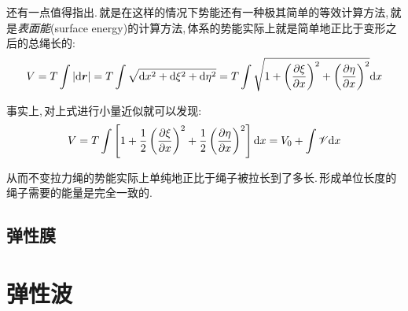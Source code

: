还有一点值得指出.\,就是在这样的情况下势能还有一种极其简单的等效计算方法,\,就是\emph{表面能}(surface energy)的计算方法,\,体系的势能实际上就是简单地正比于变形之后的总绳长的:
\[V=T\int |\textrm{d} \boldsymbol{r}|=T\int \sqrt{\textrm{d} x^2+\textrm{d} \xi^2+\textrm{d} \eta^2}=T\int \sqrt{1+\left(\frac{\partial \xi}{\partial x}\right)^2+\left(\frac{\partial \eta}{\partial x}\right)^2}\textrm{d} x\]

事实上,\,对上式进行小量近似就可以发现:
\[V=T\int \left[1+\frac{1}{2}\left(\frac{\partial \xi}{\partial x}\right)^2+\frac{1}{2}\left(\frac{\partial \eta}{\partial x}\right)^2\right]\textrm{d} x=V_0+\int \mathscr{V}\textrm{d} x\]

从而不变拉力绳的势能实际上单纯地正比于绳子被拉长到了多长.\,形成单位长度的绳子需要的能量是完全一致的.

\subsection{弹性膜}



\section{弹性波}

